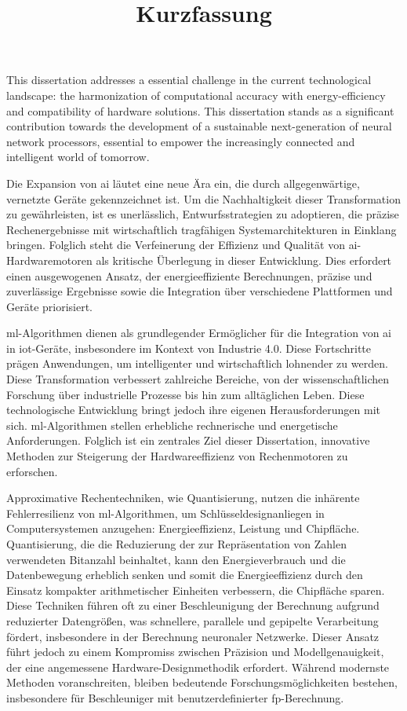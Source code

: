 \documentclass{article}
\begin{document}
This dissertation addresses a essential challenge in the current technological landscape: the harmonization of computational accuracy with energy-efficiency and compatibility of hardware solutions. This dissertation stands as a significant contribution towards the development of a sustainable next-generation of neural network processors, essential to empower the increasingly connected and intelligent world of tomorrow.

\newpage
\title{\textbf{Kurzfassung}}

\thispagestyle{empty}

Die Expansion von \gls{ai} l\"autet eine neue \"Ara ein, die durch allgegenw\"artige, vernetzte Ger\"ate gekennzeichnet ist. Um die Nachhaltigkeit dieser Transformation zu gew\"ahrleisten, ist es unerl\"asslich, Entwurfsstrategien zu adoptieren, die pr\"azise Rechenergebnisse mit wirtschaftlich tragf\"ahigen Systemarchitekturen in Einklang bringen. Folglich steht die Verfeinerung der Effizienz und Qualit\"at von \gls{ai}-Hardwaremotoren als kritische \"Uberlegung in dieser Entwicklung. Dies erfordert einen ausgewogenen Ansatz, der energieeffiziente Berechnungen, pr\"azise und zuverl\"assige Ergebnisse sowie die Integration \"uber verschiedene Plattformen und Ger\"ate priorisiert.

\gls{ml}-Algorithmen dienen als grundlegender Erm\"oglicher f\"ur die Integration von \gls{ai} in \gls{iot}-Ger\"ate, insbesondere im Kontext von Industrie 4.0. Diese Fortschritte pr\"agen Anwendungen, um intelligenter und wirtschaftlich lohnender zu werden. Diese Transformation verbessert zahlreiche Bereiche, von der wissenschaftlichen Forschung \"uber industrielle Prozesse bis hin zum allt\"aglichen Leben. Diese technologische Entwicklung bringt jedoch ihre eigenen Herausforderungen mit sich. \gls{ml}-Algorithmen stellen erhebliche rechnerische und energetische Anforderungen. Folglich ist ein zentrales Ziel dieser Dissertation, innovative Methoden zur Steigerung der Hardwareeffizienz von Rechenmotoren zu erforschen.

Approximative Rechentechniken, wie Quantisierung, nutzen die inh\"arente Fehlerresilienz von \gls{ml}-Algorithmen, um Schl\"usseldesignanliegen in Computersystemen anzugehen: Energieeffizienz, Leistung und Chipfl\"ache. Quantisierung, die die Reduzierung der zur Repr\"asentation von Zahlen verwendeten Bitanzahl beinhaltet, kann den Energieverbrauch und die Datenbewegung erheblich senken und somit die Energieeffizienz durch den Einsatz kompakter arithmetischer Einheiten verbessern, die Chipfl\"ache sparen. Diese Techniken f\"uhren oft zu einer Beschleunigung der Berechnung aufgrund reduzierter Datengr\"o\ss{}en, was schnellere, parallele und gepipelte Verarbeitung f\"ordert, insbesondere in der Berechnung neuronaler Netzwerke. Dieser Ansatz f\"uhrt jedoch zu einem Kompromiss zwischen Pr\"azision und Modellgenauigkeit, der eine angemessene Hardware-Designmethodik erfordert. W\"ahrend modernste Methoden voranschreiten, bleiben bedeutende Forschungsm\"oglichkeiten bestehen, insbesondere f\"ur Beschleuniger mit benutzerdefinierter \gls{fp}-Berechnung.
\end{document}
